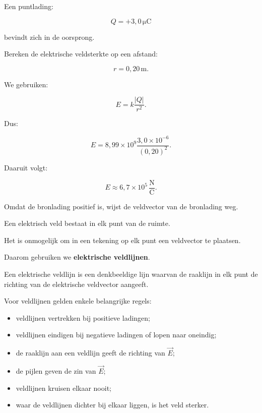 \documentclass{ximera}
\begin{document}

\begin{voorbeeld}

Een puntlading:

\[
Q=+3{,}0\,\mathrm{\mu C}
\]

bevindt zich in de oorsprong.

Bereken de elektrische veldsterkte op een afstand:

\[
r=0{,}20\,\mathrm m.
\]

We gebruiken:

\[
E
=
k\frac{|Q|}{r^2}.
\]

Dus:

\[
E
=
8{,}99\times10^9
\frac{
3{,}0\times10^{-6}
}{
(0{,}20)^2
}.
\]

Daaruit volgt:

\[
\boxed{
E\approx6{,}7\times10^5\,\mathrm{\frac NC}.
}
\]

Omdat de bronlading positief is, wijst de veldvector van de bronlading
weg.

\end{voorbeeld}




Een elektrisch veld bestaat in elk punt van de ruimte.

Het is onmogelijk om in een tekening op elk punt een veldvector te
plaatsen.

Daarom gebruiken we \textbf{elektrische veldlijnen}.


\begin{definitie}[Veldlijn]

Een elektrische veldlijn is een denkbeeldige lijn waarvan de raaklijn
in elk punt de richting van de elektrische veldvector aangeeft.

\end{definitie}


Voor veldlijnen gelden enkele belangrijke regels:

\begin{itemize}
  \item veldlijnen vertrekken bij positieve ladingen;
  \item veldlijnen eindigen bij negatieve ladingen of lopen naar
        oneindig;
  \item de raaklijn aan een veldlijn geeft de richting van $\vec E$;
  \item de pijlen geven de zin van $\vec E$;
  \item veldlijnen kruisen elkaar nooit;
  \item waar de veldlijnen dichter bij elkaar liggen, is het veld
        sterker.
\end{itemize}
\end{document}
